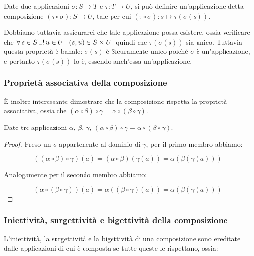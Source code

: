 \begin{definition}[Composizione]
    Date due applicazioni $\sigma : S \to T$ e
    $\tau : T \to U$, si può definire
    un'applicazione detta composizione
    $(\tau \circ \sigma) : S \to U$, tale per cui
    $(\tau \circ \sigma) : s \mapsto \tau(\sigma(s))$.
\end{definition}

Dobbiamo tuttavia assicurarci che tale applicazione
possa esistere, ossia verificare che $\forall s \in S \existsone
    u \in U \mid (s, u) \in S \times U$; quindi che $\tau(\sigma(s))$
sia unico. Tuttavia questa proprietà è banale: $\sigma(s)$ è Sicuramente
unico poiché $\sigma$ è un'applicazione, e pertanto $\tau(\sigma(s))$ lo è,
essendo anch'essa un'applicazione.

\subsubsection{Proprietà associativa della composizione}

È inoltre interessante dimostrare che la composizione rispetta la proprietà associativa,
ossia che $(\alpha \circ \beta) \circ \gamma = \alpha \circ (\beta \circ \gamma)$.

\begin{lemma}
    \label{lemma:associativita_composizione}
    Date tre applicazioni $\alpha$, $\beta$, $\gamma$,
    $(\alpha \circ \beta) \circ \gamma = \alpha \circ (\beta \circ \gamma)$.
\end{lemma}

\begin{proof}
    Preso un $a$ appartenente al dominio di $\gamma$, per il primo membro abbiamo:

    $$((\alpha \circ \beta) \circ \gamma)(a) = (\alpha \circ \beta)(\gamma(a)) =
        \alpha(\beta(\gamma(a)))$$

    Analogamente per il secondo membro abbiamo:

    $$(\alpha \circ (\beta \circ \gamma))(a) = \alpha((\beta \circ \gamma)(a)) =
        \alpha(\beta(\gamma(a)))$$
\end{proof}

\subsubsection{Iniettività, surgettività e bigettività della composizione}

L'iniettività, la surgettività e la bigettività di una composizione sono
ereditate dalle applicazioni di cui è composta se tutte queste le rispettano, ossia:

